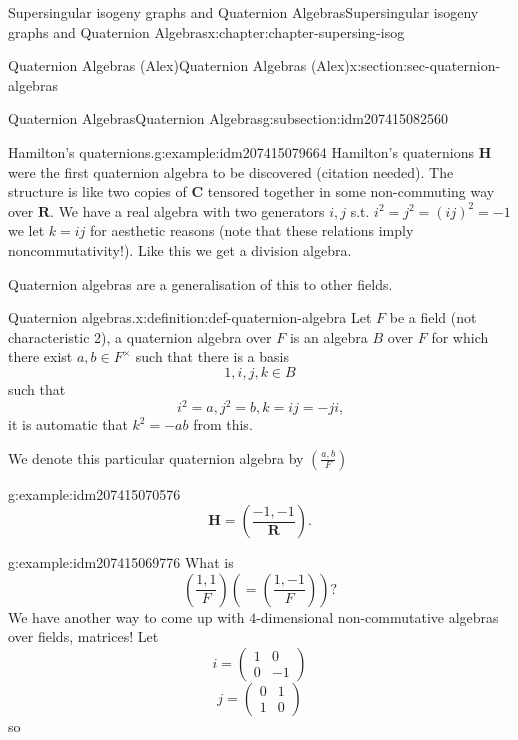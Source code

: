 \documentclass[oneside,10pt,]{book}
\numberwithin{equation}{section}
\newcommand{\legendre}[2]{\left(\frac{#1}{#2}\right)}
\newcommand{\RR}{\mathbf{R}}
\newcommand{\CC}{\mathbf{C}}
\newcommand{\HH}{\mathbf{H}}
\newcommand{\amp}{&}
\begin{document}
\begin{chapterptx}{Supersingular isogeny graphs and Quaternion Algebras}{}{Supersingular isogeny graphs and Quaternion Algebras}{}{}{x:chapter:chapter-supersing-isog}
\begin{sectionptx}{Quaternion Algebras (Alex)}{}{Quaternion Algebras (Alex)}{}{}{x:section:sec-quaternion-algebras}
\begin{subsectionptx}{Quaternion Algebras}{}{Quaternion Algebras}{}{}{g:subsection:idm207415082560}
\begin{introduction}{}
\begin{example}{Hamilton's quaternions.}{g:example:idm207415079664}
Hamilton's quaternions \(\HH\) were the first quaternion algebra to be discovered (citation needed). The structure is like two copies of \(\CC\) tensored together in some non-commuting way over \(\RR\). We have a real algebra with two generators \(i,j\) s.t. \(i^2 = j^2  = (ij)^2 = -1\) we let \(k = ij\) for aesthetic reasons (note that these relations imply noncommutativity!). Like this we get a division algebra.%
\end{example}
Quaternion algebras are a generalisation of this to other fields.%
\begin{definition}{Quaternion algebras.}{x:definition:def-quaternion-algebra}%
Let \(F\) be a field (not characteristic 2), a quaternion algebra over \(F\) is an algebra \(B\) over \(F\) for which there exist \(a,b\in F^\times\) such that there is a basis%
\begin{equation*}
1,i,j,k \in B
\end{equation*}
such that%
\begin{equation*}
i^2 = a,j^2=b,k=ij=-ji\text{,}
\end{equation*}
it is automatic that \(k^2 = -ab\) from this.%
\par
We denote this particular quaternion algebra by \(\legendre{a,b}{F}\)%
\end{definition}
\begin{example}{}{g:example:idm207415070576}%
%
\begin{equation*}
\HH = \legendre{-1,-1}{\RR}\text{.}
\end{equation*}
%
\end{example}
\begin{example}{}{g:example:idm207415069776}%
What is%
\begin{equation*}
\legendre{1,1}{F} \left( = \legendre{1,-1}{F}\right)\text{?}
\end{equation*}
We have another way to come up with \(4\)-dimensional non-commutative algebras over fields, matrices! Let%
\begin{equation*}
i=  \begin{pmatrix} 1\amp0\\0\amp -1\end{pmatrix}
\end{equation*}
%
\begin{equation*}
j =\begin{pmatrix} 0\amp1\\1\amp 0\end{pmatrix}
\end{equation*}
so%
\begin{equation*}

\end{equation*}
\end{example}
\end{introduction}
\end{subsectionptx}
\end{sectionptx}
\end{chapterptx}
\end{document}
